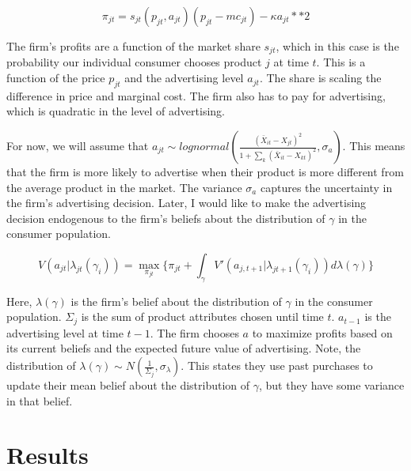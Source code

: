 \documentclass[11pt]{article}
\theoremstyle{definition}
\theoremstyle{remark}
\begin{document}
\begin{equation}
  \pi_{jt} = s_{jt}(p_{jt},a_{jt})(p_{jt}-mc_{jt}) - \kappa a_{jt}**2
\end{equation}

The firm's profits are a function of the market share $s_{jt}$, which in this case is the probability our individual consumer chooses product $j$ at time $t$. This is a function of the price $p_{jt}$ and the advertising level $a_{jt}$. The share is scaling the difference in price and marginal cost. The firm also has to pay for advertising, which is quadratic in the level of advertising.

For now, we will assume that $a_{jt}\sim lognormal(\frac{(\bar{X}_{it} - X_{jt})^2}{1 + \sum_{k} (\bar{X}_{it} - X_{kt})^2}, \sigma_a)$. This means that the firm is more likely to advertise when their product is more different from the average product in the market. The variance $\sigma_a$ captures the uncertainty in the firm's advertising decision. Later, I would like to make the advertising
decision endogenous to the firm's beliefs about the distribution of $\gamma$ in the consumer population.


\begin{equation}
  V(a_{jt}|\lambda_{jt}(\gamma_{i})) = \max_{\pi_{jt}} \{\pi_{jt} + \int_{\gamma} V'(a_{j,t+1}|\lambda_{jt+1}(\gamma_i)) d\lambda(\gamma)\}
\end{equation}

Here, $\lambda(\gamma)$ is the firm's belief about the distribution of $\gamma$ in the consumer population. $\Sigma_j$ is the sum of product attributes chosen until time $t$. $a_{t-1}$ is the advertising level at time $t-1$.
The firm chooses $a$ to maximize profits based on its current beliefs and the expected future value of advertising. Note, the distribution of $\lambda(\gamma) \sim N(\frac{1}{\Sigma_j}, \sigma_{\lambda})$.
This states they use past purchases to update their mean belief about the distribution of $\gamma$, but they have some variance in that belief.

\section{Results}
\end{document}
